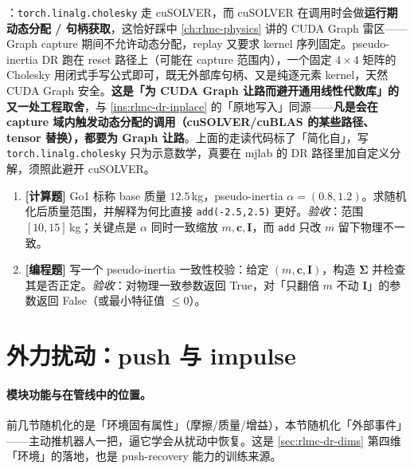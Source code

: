 \begin{finenote}
：\texttt{torch.linalg.cholesky} 走 cuSOLVER，而 cuSOLVER 在调用时会做\textbf{运行期动态分配 / 句柄获取}，这恰好踩中 \cref{ch:rlmc-physics} 讲的 CUDA Graph 雷区——Graph capture 期间不允许动态分配，replay 又要求 kernel 序列固定。pseudo-inertia DR 跑在 reset 路径上（可能在 capture 范围内），一个固定 $4\times4$ 矩阵的 Cholesky 用闭式手写公式即可，既无外部库句柄、又是纯逐元素 kernel，天然 CUDA Graph 安全。\textbf{这是「为 CUDA Graph 让路而避开通用线性代数库」的又一处工程取舍}，与 \cref{ins:rlmc-dr-inplace} 的「原地写入」同源——\textbf{凡是会在 capture 域内触发动态分配的调用（cuSOLVER/cuBLAS 的某些路径、tensor 替换），都要为 Graph 让路}。上面的走读代码标了「简化自」，写 \verb|torch.linalg.cholesky| 只为示意数学，真要在 mjlab 的 DR 路径里加自定义分解，须照此避开 cuSOLVER。
\end{finenote}

\begin{practice}[本节练习]
\begin{enumerate}
  \item \textbf{[计算题]} Go1 标称 base 质量 $12.5$\,kg，pseudo-inertia $\alpha=(0.8,1.2)$。求随机化后质量范围，并解释为何比直接 \verb|add(-2.5,2.5)| 更好。\emph{验收}：范围 $[10,15]$\,kg；关键点是 $\alpha$ 同时一致缩放 $m,\mathbf c,\mathbf I$，而 \verb|add| 只改 $m$ 留下物理不一致。
  \item \textbf{[编程题]} 写一个 pseudo-inertia 一致性校验：给定 $(m,\mathbf c,\mathbf I)$，构造 $\boldsymbol\Sigma$ 并检查其是否正定。\emph{验收}：对物理一致参数返回 True，对「只翻倍 $m$ 不动 $\mathbf I$」的参数返回 False（或最小特征值 $\le 0$）。
\end{enumerate}
\end{practice}

\section{外力扰动：push 与 impulse}
\label{sec:rlmc-dr-force}

\paragraph{模块功能与在管线中的位置。}前几节随机化的是「环境固有属性」（摩擦/质量/增益），本节随机化「外部事件」——主动推机器人一把，逼它学会从扰动中恢复。这是 \cref{sec:rlmc-dr-dims} 第四维「环境」的落地，也是 push-recovery 能力的训练来源。

